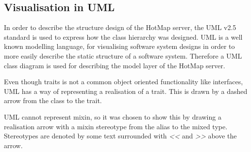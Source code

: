 \subsection{Visualisation in UML}
In order to describe the structure design of the HotMap server, the UML v2.5 standard is used to express how the class hierarchy was designed. UML is a well known modelling language, for visualising software system designs in order to more easily describe the static structure of a software system. Therefore a UML class diagram is used for describing the model layer of the HotMap server.

Even though traits is not a common object oriented functionality like interfaces, UML has a way of representing a realisation of a trait. This is drawn by a dashed arrow from the class to the trait.

UML cannot represent mixin, so it was chosen to show this by drawing a realisation arrow with a mixin stereotype from the alias to the mixed type. Stereotypes are denoted by some text surrounded with \emph{<<} and \emph{>>} above the arrow.


